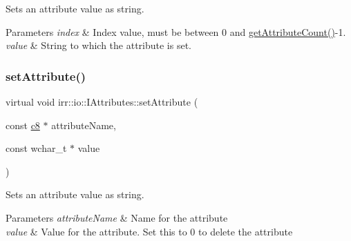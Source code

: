 Sets an attribute value as string. 


\begin{DoxyParams}{Parameters}
{\em index} & Index value, must be between 0 and \hyperlink{classirr_1_1io_1_1IAttributes_a796bdd9440ee7ba0b6742a90a82870b6}{get\+Attribute\+Count()}-\/1. \\
\hline
{\em value} & String to which the attribute is set. \\
\hline
\end{DoxyParams}
\mbox{\label{classirr_1_1io_1_1IAttributes_a61d592097529c763c1da1db8ef5af224}} 
\subsubsection{\texorpdfstring{set\+Attribute()}{setAttribute()}\hspace{0.1cm}{\footnotesize\ttfamily [5/10]}}
{\footnotesize\ttfamily virtual void irr\+::io\+::\+I\+Attributes\+::set\+Attribute (\begin{DoxyParamCaption}\item[{const \hyperlink{namespaceirr_a9395eaea339bcb546b319e9c96bf7410}{c8} $\ast$}]{attribute\+Name,  }\item[{const wchar\+\_\+t $\ast$}]{value }\end{DoxyParamCaption})\hspace{0.3cm}{\ttfamily [pure virtual]}}



Sets an attribute value as string. 


\begin{DoxyParams}{Parameters}
{\em attribute\+Name} & Name for the attribute \\
\hline
{\em value} & Value for the attribute. Set this to 0 to delete the attribute \\
\hline
\end{DoxyParams}
\mbox{\label{classirr_1_1io_1_1IAttributes_a61d592097529c763c1da1db8ef5af224}} 
